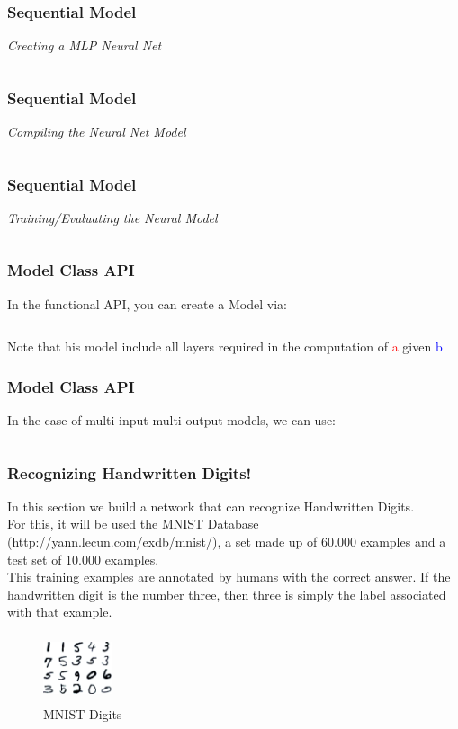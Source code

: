 \documentclass[aspectratio=169]{beamer}
\begin{document}
\begin{frame}
\frametitle{Sequential Model}
\textit{Creating a MLP Neural Net}
\inputminted{python}{ten.py}
\end{frame}

\begin{frame}
\frametitle{Sequential Model}
\textit{Compiling the Neural Net Model}
\inputminted{python}{eleven.py}
\end{frame}

\begin{frame}
\frametitle{Sequential Model}
\textit{Training/Evaluating the Neural Model}
\inputminted{python}{twelve.py}
\end{frame}

\begin{frame}
\frametitle{Model Class API}
In the functional API, you can create a Model via:
\\[0.2cm]
\inputminted{python}{thirteen.py}
Note that his model include all layers required in the computation of \textcolor{red}{a} given \textcolor{blue}{b}
\end{frame}

\begin{frame}
\frametitle{Model Class API}
In the case of multi-input multi-output models, we can use:
\\[0.2cm]
\inputminted{python}{fourteen.py}
\end{frame}

\begin{frame}
\frametitle{Recognizing Handwritten Digits!}
In this section we build a network that can recognize Handwritten Digits.
\\[0.3cm]
For this, it will be used the MNIST Database (http://yann.lecun.com/exdb/mnist/), a set made up of 60.000 examples and a test set of 10.000 examples.
\\[0.3cm]
This training examples are annotated by humans with the correct answer. If the handwritten digit is the number three, then three is simply the label associated with that example.
\begin{figure}
\includegraphics[width=2cm,height=2cm]{one.jpg}
\caption{MNIST Digits}
\label{fig:MNIST Digits}
\end{figure}
\end{frame}
\end{document}
